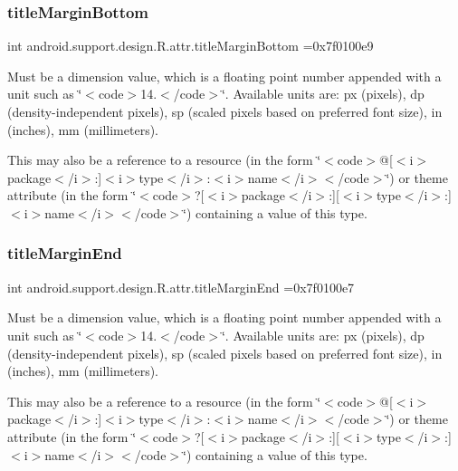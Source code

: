\subsubsection{\texorpdfstring{title\+Margin\+Bottom}{titleMarginBottom}}
{\footnotesize\ttfamily int android.\+support.\+design.\+R.\+attr.\+title\+Margin\+Bottom =0x7f0100e9\hspace{0.3cm}{\ttfamily [static]}}

Must be a dimension value, which is a floating point number appended with a unit such as \char`\"{}$<$code$>$14.\+5sp$<$/code$>$\char`\"{}. Available units are\+: px (pixels), dp (density-\/independent pixels), sp (scaled pixels based on preferred font size), in (inches), mm (millimeters). 

This may also be a reference to a resource (in the form \char`\"{}$<$code$>$@\mbox{[}$<$i$>$package$<$/i$>$\+:\mbox{]}$<$i$>$type$<$/i$>$\+:$<$i$>$name$<$/i$>$$<$/code$>$\char`\"{}) or theme attribute (in the form \char`\"{}$<$code$>$?\mbox{[}$<$i$>$package$<$/i$>$\+:\mbox{]}\mbox{[}$<$i$>$type$<$/i$>$\+:\mbox{]}$<$i$>$name$<$/i$>$$<$/code$>$\char`\"{}) containing a value of this type. \mbox{\label{classandroid_1_1support_1_1design_1_1R_1_1attr_a6f4a4d32dd0149d89489859570ae1e40}} 
\subsubsection{\texorpdfstring{title\+Margin\+End}{titleMarginEnd}}
{\footnotesize\ttfamily int android.\+support.\+design.\+R.\+attr.\+title\+Margin\+End =0x7f0100e7\hspace{0.3cm}{\ttfamily [static]}}

Must be a dimension value, which is a floating point number appended with a unit such as \char`\"{}$<$code$>$14.\+5sp$<$/code$>$\char`\"{}. Available units are\+: px (pixels), dp (density-\/independent pixels), sp (scaled pixels based on preferred font size), in (inches), mm (millimeters). 

This may also be a reference to a resource (in the form \char`\"{}$<$code$>$@\mbox{[}$<$i$>$package$<$/i$>$\+:\mbox{]}$<$i$>$type$<$/i$>$\+:$<$i$>$name$<$/i$>$$<$/code$>$\char`\"{}) or theme attribute (in the form \char`\"{}$<$code$>$?\mbox{[}$<$i$>$package$<$/i$>$\+:\mbox{]}\mbox{[}$<$i$>$type$<$/i$>$\+:\mbox{]}$<$i$>$name$<$/i$>$$<$/code$>$\char`\"{}) containing a value of this type. \mbox{\label{classandroid_1_1support_1_1design_1_1R_1_1attr_a62098fcd5729333af2c4347b968ab03a}} 
